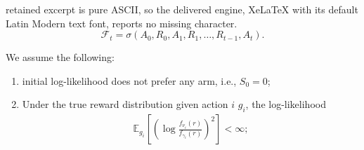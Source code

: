 \documentclass[10pt,a4paper]{amsart}
\newcommand{\E}{\mathbb{E}}
\begin{document}
retained excerpt is pure ASCII, so the delivered engine, XeLaTeX with its default Latin Modern text font, reports no missing character.
\begin{equation}
\mathcal{F}_t = \sigma(A_0, R_0, A_1, R_1, \ldots, R_{t-1}, A_t).
\label{eq:filtration}
\end{equation}

\begin{assumption}
We assume the following: 
\begin{enumerate}
    \item initial log-likelihood does not prefer any arm, i.e., $S_0 = 0$;
    \item Under the true reward distribution given action $i$ $g_i$, the log-likelihood
    \begin{align*}
        \E_{g_i} \left[ \left( \log \frac{f_{\nu_i}(r)} {f_{\gamma_i}(r)} \right)^2 \right] < \infty;
    \end{align*}
\end{enumerate}\label{as:two-arm}
\end{assumption}
\end{document}
